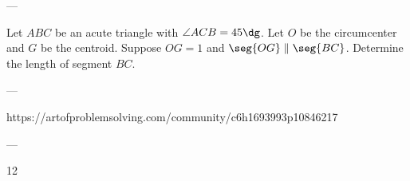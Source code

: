 
---

Let $ABC$ be an acute triangle with $\angle ACB=45\dg$. Let $O$ be the circumcenter and $G$ be the centroid. Suppose $OG=1$ and $\seg{OG}\parallel\seg{BC}$. Determine the length of segment $BC$.

---

https://artofproblemsolving.com/community/c6h1693993p10846217

---

12
